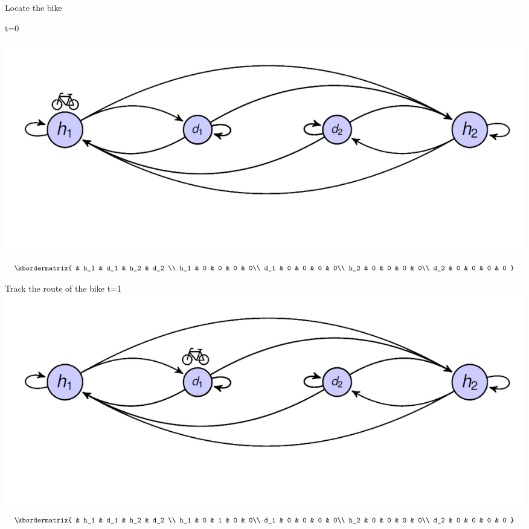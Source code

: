 \begin{frame}{Locate the bike}
	
t=0

\includegraphics[width=\linewidth]{graphics/createmarkov_initial}
\[
\kbordermatrix{ 
	&  h_1 &  d_1  &  h_2  &  d_2 \\
	h_1  & 0 & 0 & 0 & 0\\
	d_1 & 0  & 0 & 0  & 0\\
	h_2  & 0 & 0   & 0 & 0\\
	d_2  & 0  & 0   & 0  & 0
}
\]
	
\end{frame}

\begin{frame}{Track the route of the bike}
t=1	
\includegraphics[width=\linewidth]{graphics/createmarkov_firststep}	
\[
	\kbordermatrix{ 
		&  h_1 &  d_1  &  h_2  &  d_2 \\
		h_1  & 0 & 1 & 0 & 0\\
		d_1 & 0  & 0 & 0  & 0\\
		h_2  & 0 & 0   & 0 & 0\\
		d_2  & 0  & 0   & 0  & 0
	}
	\]
	
\end{frame}

